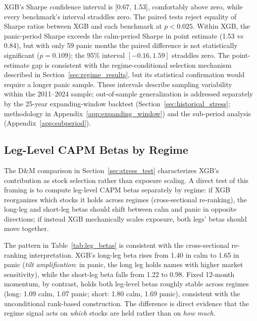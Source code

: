 

XGB's Sharpe confidence interval is [0.67, 1.53], comfortably above zero, while every benchmark's interval straddles zero. The paired tests reject equality of Sharpe ratios between XGB and each benchmark at $p < 0.025$. Within XGB, the panic-period Sharpe exceeds the calm-period Sharpe in point estimate (1.53 vs 0.84), but with only 59 panic months the paired difference is not statistically significant ($p = 0.109$); the 95\% interval $[-0.16, 1.59]$ straddles zero. The point-estimate gap is consistent with the regime-conditional selection mechanism described in Section~\ref{sec:regime_results}, but its statistical confirmation would require a longer panic sample. These intervals describe sampling variability within the 2011--2024 sample; out-of-sample generalization is addressed separately by the 25-year expanding-window backtest (Section~\ref{sec:historical_stress}; methodology in Appendix~\ref{app:expanding_window}) and the sub-period analysis (Appendix~\ref{app:subperiod}).

\subsection{Leg-Level CAPM Betas by Regime}\label{app:leg_betas}

The D\&M comparison in Section~\ref{sec:stress_test} characterizes XGB's contribution as stock selection rather than exposure scaling. A direct test of this framing is to compute leg-level CAPM betas separately by regime: if XGB reorganizes which stocks it holds across regimes (cross-sectional re-ranking), the long-leg and short-leg betas should shift between calm and panic in opposite directions; if instead XGB mechanically scales exposure, both legs' betas should move together.



The pattern in Table~\ref{tab:leg_betas} is consistent with the cross-sectional re-ranking interpretation. XGB's long-leg beta rises from 1.40 in calm to 1.65 in panic (\emph{tilt amplification}: in panic, the long leg holds names with higher market sensitivity), while the short-leg beta falls from 1.22 to 0.98. Fixed 12-month momentum, by contrast, holds both leg-level betas roughly stable across regimes (long: 1.09 calm, 1.07 panic; short: 1.80 calm, 1.69 panic), consistent with the unconditional rank-based construction. The difference is direct evidence that the regime signal acts on \emph{which} stocks are held rather than on \emph{how much}.

